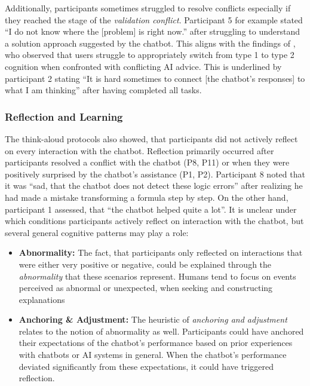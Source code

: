 Additionally, participants sometimes struggled to resolve conflicts especially if they reached the stage of the \textit{validation conflict}. Participant 5 for example stated “I do not know where the [problem] is right now.” after struggling to understand a solution approach suggested by the chatbot. This aligns with the findings of \cite{Jussupow2021}, who observed that users struggle to appropriately switch from type 1 to type 2 cognition when confronted with conflicting AI advice. This is underlined by participant 2 stating “It is hard sometimes to connect [the chatbot's responses] to what I am thinking” after having completed all tasks.

\subsubsection{Reflection and Learning} \label{sssec:reflection_learning}

The think-aloud protocols also showed, that participants did not actively reflect on every interaction with the chatbot. Reflection primarily occurred after participants resolved a conflict with the chatbot (P8, P11) or when they were positively surprised by the chatbot's assistance (P1, P2). Participant 8 noted that it was “sad, that the chatbot does not detect these logic errors” after realizing he had made a mistake transforming a formula step by step. On the other hand, participant 1 assessed, that “the chatbot helped quite a lot”. It is unclear under which conditions participants actively reflect on interaction with the chatbot, but several general cognitive patterns may play a role:

\begin{itemize}
    \item \textbf{Abnormality:} The fact, that participants only reflected on interactions that were either very positive or negative, could be explained through the \textit{abnormality} that these scenarios represent. Humans tend to focus on events perceived as abnormal or unexpected, when seeking and constructing explanations \parencite{Miller2019}
    \item \textbf{Anchoring \& Adjustment:} The heuristic of \textit{anchoring and adjustment} \parencite{Tversky1974} relates to the notion of abnormality as well. Participants could have anchored their expectations of the chatbot's performance based on prior experiences with chatbots or AI systems in general. When the chatbot's performance deviated significantly from these expectations, it could have triggered reflection.
\end{itemize}

